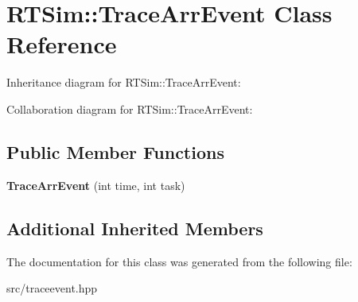 \hypertarget{classRTSim_1_1TraceArrEvent}{}\section{R\+T\+Sim\+:\+:Trace\+Arr\+Event Class Reference}
\label{classRTSim_1_1TraceArrEvent}


Inheritance diagram for R\+T\+Sim\+:\+:Trace\+Arr\+Event\+:


Collaboration diagram for R\+T\+Sim\+:\+:Trace\+Arr\+Event\+:
\subsection*{Public Member Functions}
\begin{DoxyCompactItemize}
\item 
{\bfseries Trace\+Arr\+Event} (int time, int task)\hypertarget{classRTSim_1_1TraceArrEvent_a955f16a3a7f3b43e63927421e8cbe4d2}{}\label{classRTSim_1_1TraceArrEvent_a955f16a3a7f3b43e63927421e8cbe4d2}

\end{DoxyCompactItemize}
\subsection*{Additional Inherited Members}


The documentation for this class was generated from the following file\+:\begin{DoxyCompactItemize}
\item 
src/traceevent.\+hpp\end{DoxyCompactItemize}
